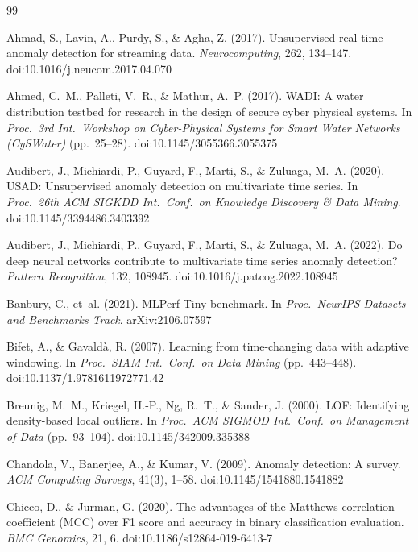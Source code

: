 \documentclass[11pt]{article}
\begin{document}
\begin{thebibliography}{99}
\small

 Ahmad, S., Lavin, A., Purdy, S., \& Agha, Z. (2017). Unsupervised real-time anomaly detection for streaming data. \emph{Neurocomputing}, 262, 134--147. doi:10.1016/j.neucom.2017.04.070

 Ahmed, C.~M., Palleti, V.~R., \& Mathur, A.~P. (2017). WADI: A water distribution testbed for research in the design of secure cyber physical systems. In \emph{Proc.\ 3rd Int.\ Workshop on Cyber-Physical Systems for Smart Water Networks (CySWater)} (pp.\ 25--28). doi:10.1145/3055366.3055375

 Audibert, J., Michiardi, P., Guyard, F., Marti, S., \& Zuluaga, M.~A. (2020). USAD: Unsupervised anomaly detection on multivariate time series. In \emph{Proc.\ 26th ACM SIGKDD Int.\ Conf.\ on Knowledge Discovery \& Data Mining}. doi:10.1145/3394486.3403392

 Audibert, J., Michiardi, P., Guyard, F., Marti, S., \& Zuluaga, M.~A. (2022). Do deep neural networks contribute to multivariate time series anomaly detection? \emph{Pattern Recognition}, 132, 108945. doi:10.1016/j.patcog.2022.108945

 Banbury, C., et~al. (2021). MLPerf Tiny benchmark. In \emph{Proc.\ NeurIPS Datasets and Benchmarks Track}. arXiv:2106.07597

 Bifet, A., \& Gavald\`a, R. (2007). Learning from time-changing data with adaptive windowing. In \emph{Proc.\ SIAM Int.\ Conf.\ on Data Mining} (pp.\ 443--448). doi:10.1137/1.9781611972771.42

 Breunig, M.~M., Kriegel, H.-P., Ng, R.~T., \& Sander, J. (2000). LOF: Identifying density-based local outliers. In \emph{Proc.\ ACM SIGMOD Int.\ Conf.\ on Management of Data} (pp.\ 93--104). doi:10.1145/342009.335388

 Chandola, V., Banerjee, A., \& Kumar, V. (2009). Anomaly detection: A survey. \emph{ACM Computing Surveys}, 41(3), 1--58. doi:10.1145/1541880.1541882

 Chicco, D., \& Jurman, G. (2020). The advantages of the Matthews correlation coefficient (MCC) over F1 score and accuracy in binary classification evaluation. \emph{BMC Genomics}, 21, 6. doi:10.1186/s12864-019-6413-7


\end{thebibliography}
\end{document}
